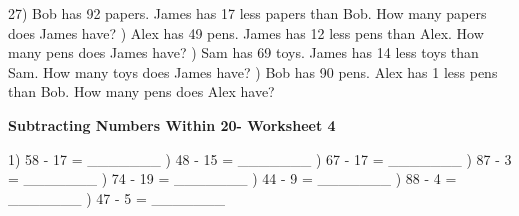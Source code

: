 \documentclass{article}%
\begin{document}
27) Bob has 92 papers. James has 17 less papers than Bob. How many papers does James have?%
\newline%
\newline%
) Alex has 49 pens. James has 12 less pens than Alex. How many pens does James have?%
\newline%
\newline%
) Sam has 69 toys. James has 14 less toys than Sam. How many toys does James have?%
\newline%
\newline%
) Bob has 90 pens. Alex has 1 less pens than Bob. How many pens does Alex have?%
\newline%
\newline%
\newline%
\pagebreak%
\large%
\begin{center}%
\textbf{Subtracting Numbers Within 20- Worksheet 4}%
\newline%
\newline%
\newline%
\end{center} \normalsize%
1) 58 {-} 17 = \_\_\_\_\_\_\_%
\newline%
\newline%
) 48 {-} 15 = \_\_\_\_\_\_\_%
\newline%
\newline%
) 67 {-} 17 = \_\_\_\_\_\_\_%
\newline%
\newline%
) 87 {-} 3 = \_\_\_\_\_\_\_%
\newline%
\newline%
) 74 {-} 19 = \_\_\_\_\_\_\_%
\newline%
\newline%
) 44 {-} 9 = \_\_\_\_\_\_\_%
\newline%
\newline%
) 88 {-} 4 = \_\_\_\_\_\_\_%
\newline%
\newline%
) 47 {-} 5 = \_\_\_\_\_\_\_%
\newline%
\end{document}
